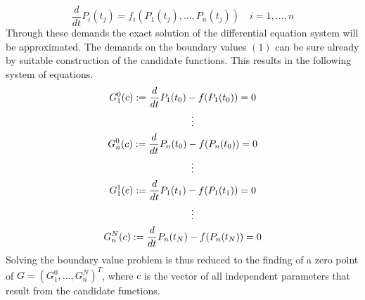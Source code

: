 \documentclass[letterpaper,10pt,english]{sphinxmanual}
\begin{document}
\begin{equation}
   \frac{d}{d t} P_i(t_j) = f_i(P_1(t_j),...,P_n(t_j)) \quad i = 1,...,n
\end{equation}
Through these demands the exact solution of the differential equation system will be approximated.
The demands on the boundary values \((1)\) can be sure already by suitable
construction of the candidate functions. This results in the following system of equations.
\begin{gather}
\begin{split}G_1^0(c) := \frac{d}{d t}P_1(t_0) - f(P_1(t_0)) = 0\end{split}\notag\\\begin{split}\qquad \vdots\end{split}\notag\\\begin{split}G_n^0(c) := \frac{d}{d t}P_n(t_0) - f(P_n(t_0)) = 0\end{split}\notag\\\begin{split}\qquad \vdots\end{split}\notag\\\begin{split}G_1^1(c) := \frac{d}{d t}P_1(t_1) - f(P_1(t_1)) = 0\end{split}\notag\\\begin{split}\qquad \vdots\end{split}\notag\\\begin{split}G_n^N(c) := \frac{d}{d t}P_n(t_N) - f(P_n(t_N)) = 0\end{split}\notag
\end{gather}
Solving the boundary value problem is thus reduced to the finding of a zero point
of \(G = (G_1^0 ,..., G_n^N)^T\), where \(c\) is the vector of all independent
parameters that result from the candidate functions.
\end{document}
